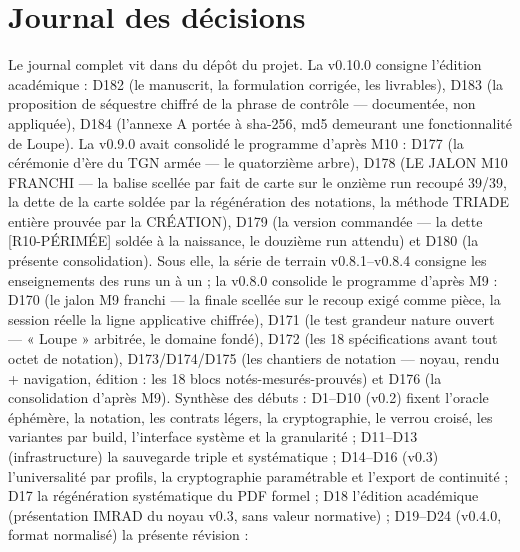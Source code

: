 \section{Journal des décisions}\label{sec:decisions}

Le journal complet vit dans  du dépôt du projet. La
v0.10.0 consigne l'édition académique : D182 (le manuscrit, la formulation
corrigée, les livrables), D183 (la proposition de séquestre chiffré de la
phrase de contrôle — documentée, non appliquée), D184 (l'annexe A portée à
sha-256, md5 demeurant une fonctionnalité de Loupe). La v0.9.0 avait
consolidé le programme d'après M10 : D177 (la cérémonie d'ère du TGN
armée — le quatorzième arbre), D178 (LE JALON M10 FRANCHI — la balise
 scellée par fait de carte sur le onzième run recoupé 39/39,
la dette de la carte soldée par la régénération des notations, la méthode TRIADE
entière prouvée par la CRÉATION), D179 (la version  commandée
— la dette [R10-PÉRIMÉE] soldée à la naissance, le douzième run attendu) et
D180 (la présente consolidation). Sous elle, la série de terrain v0.8.1–v0.8.4
consigne les enseignements des runs un à un ; la v0.8.0 consolide le programme
d'après M9 : D170 (le jalon M9 franchi — la finale  scellée sur le
recoup exigé comme pièce, la session réelle la ligne applicative chiffrée),
D171 (le test grandeur nature ouvert — « Loupe » arbitrée, le domaine
 fondé), D172 (les 18 spécifications avant tout octet de notation),
D173/D174/D175 (les chantiers de notation — noyau, rendu + navigation, édition :
les 18 blocs notés-mesurés-prouvés) et D176 (la consolidation d'après M9).
Synthèse des débuts :
D1–D10 (v0.2) fixent l'oracle éphémère, la notation, les contrats légers, la
cryptographie, le verrou croisé, les variantes par build, l'interface système et la
granularité ; D11–D13 (infrastructure) la sauvegarde triple et systématique ; D14–D16
(v0.3) l'universalité par profils, la cryptographie paramétrable et l'export de
continuité ; D17 la régénération systématique du PDF formel ; D18 l'édition académique
(présentation IMRAD du noyau v0.3, sans valeur normative) ; D19–D24 (v0.4.0, format
normalisé) la présente révision :

